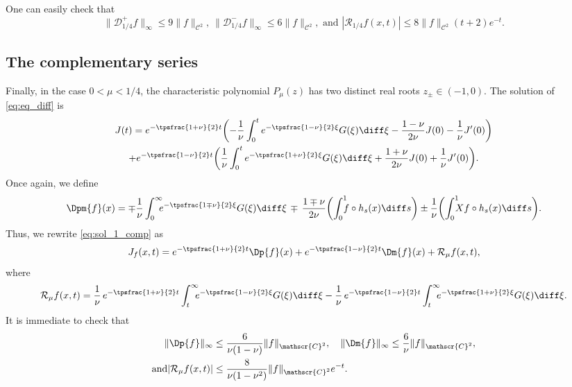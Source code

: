 One can easily check that
\begin{equation*}
\|\mathcal{D}_{1/4}^{+}f\|_{\infty} \leq 9\|f\|_{\mathscr{C}^2}, \ \|\mathcal{D}_{1/4}^{-}f\|_{\infty} \leq 6 \|f\|_{\mathscr{C}^2}, \text{ and } |\mathcal{R}_{1/4}f(x,t) |\leq 8 \|f\|_{\mathscr{C}^2} (t+2)e^{-t}.
\end{equation*}


\subsection{The complementary series}\label{sec:comp}

Finally, in the case $0< \mu < 1/4$, the characteristic polynomial $P_\mu(z)$ has two distinct real roots $z_{\pm} \in (-1,0)$. The solution of \eqref{eq:eq_diff} is
\begin{multline}\label{eq:sol_1_comp}
J(t) = e^{-\tpsfrac{1+\nu}{2}t} \biggl(- \frac{1}{\nu} \int_0^t e^{-\tpsfrac{1-\nu}{2}\xi} G(\xi) \diff \xi - \frac{1-\nu}{2\nu} J(0) - \frac{1}{\nu}J'(0) \biggr) \\
+ e^{-\tpsfrac{1-\nu}{2}t} \biggl(\frac{1}{\nu} \int_0^t e^{-\tpsfrac{1+\nu}{2}\xi} G(\xi) \diff \xi + \frac{1+\nu}{2\nu} J(0) + \frac{1}{\nu}J'(0) \biggr).
\end{multline}
Once again, we define
\[
\Dpm{f}(x) = \mp \frac{1}{\nu} \int_0^\infty \hspace*{-2mm}e^{-\tpsfrac{1 \mp \nu}{2}\xi} G(\xi) \diff \xi \,\mp\, \frac{1 \mp \nu}{2\nu} \biggl(\int_0^1\hspace*{-2mm} f \circ h_s(x) \diff s \biggr) \pm \frac{1}{\nu} \biggl(\int_0^1\hspace*{-2mm} Xf \circ h_s(x) \diff s \biggr).
\]
Thus, we rewrite \eqref{eq:sol_1_comp} as
\begin{equation}\label{eq:I_mu_comp}
J_f(x,t) = e^{-\tpsfrac{1+\nu}{2}t} \Dp{f}(x) + e^{-\tpsfrac{1-\nu}{2}t} \Dm{f}(x) + \mathcal{R}_\mu f(x,t),
\end{equation}
where
\[
\mathcal{R}_\mu f(x,t) = \frac{1}{\nu}\, e^{-\tpsfrac{1+\nu}{2}t} \int_t^{\infty}\hspace*{-2mm} e^{-\tpsfrac{1-\nu}{2}\xi} G(\xi) \diff \xi - \frac{1}{\nu}\, e^{-\tpsfrac{1-\nu}{2}t} \int_t^{\infty}\hspace*{-2mm} e^{-\tpsfrac{1+\nu}{2}\xi} G(\xi) \diff \xi.
\]
It is immediate to check that
\begin{align*}
\|\Dp{f}\|_{\infty} &\leq \frac{6}{\nu(1-\nu)} \|f\|_{\mathscr{C}^2}, \quad \|\Dm{f}\|_{\infty} \leq \frac{6}{\nu} \|f\|_{\mathscr{C}^2},\\
\tag*{and} |\mathcal{R}_\mu f(x,t) |&\leq \frac{8}{\nu(1-\nu^2)} \|f\|_{\mathscr{C}^2} e^{-t}.
\end{align*}

